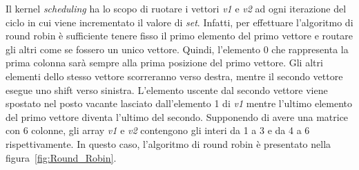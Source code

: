 Il kernel \textit{scheduling} ha lo scopo di ruotare i vettori \textit{v1} e  \textit{v2} ad ogni iterazione del ciclo in cui viene incrementato il valore di \textit{set}. Infatti, per effettuare l'algoritmo di round robin è sufficiente tenere fisso il primo elemento del primo vettore e routare gli altri come se fossero un unico vettore. Quindi, l'elemento 0 che rappresenta la prima colonna sarà sempre alla prima posizione del primo vettore. Gli altri elementi dello stesso vettore scorreranno verso destra, mentre il secondo vettore esegue uno shift verso sinistra. L'elemento uscente dal secondo vettore viene spostato nel posto vacante lasciato dall'elemento 1 di \textit{v1} mentre l'ultimo elemento del primo vettore diventa l'ultimo del secondo. Supponendo di avere una matrice con 6 colonne, gli array \textit{v1} e \textit{v2} contengono gli interi da 1 a 3 e da 4 a 6 rispettivamente. In questo caso, l'algoritmo di round robin è presentato nella figura~\ref{fig:Round_Robin}.
